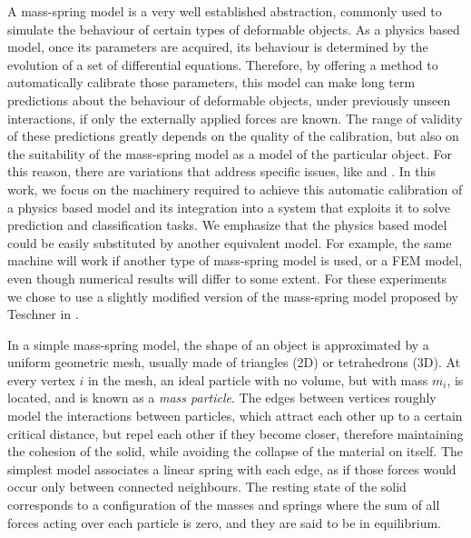 \documentclass[journal]{IEEEtran}
\newcommand{\sref}[1]{Section~\ref{#1}}
\begin{document}
A mass-spring model is a very well established abstraction, commonly used to simulate the behaviour of certain types of deformable objects.  As a physics based model, once its parameters are acquired, its behaviour is determined by the evolution of a set of differential equations.  Therefore, by offering a method to automatically calibrate those parameters, this model can make long term predictions about the behaviour of deformable objects, under previously unseen interactions, if only the externally applied forces are known.  The range of validity of these predictions greatly depends on the quality of the calibration, but also on the suitability of the mass-spring model as a model of the particular object.  For this reason, there are variations that address specific issues, like \cite{Bourguignon2000} and \cite{Teschner2004}.  In this work, we focus on the machinery required to achieve this automatic calibration of a physics based model and its integration into a system that exploits it to solve prediction and classification tasks.  We emphasize that the physics based model could be easily substituted by another equivalent model.  For example, the same machine will work if another type of mass-spring model is used, or a FEM model, even though numerical results will differ to some extent.  For these experiments we chose to use a slightly modified version of the mass-spring model proposed by Teschner in \cite{Teschner2004}.


In a simple mass-spring model, the shape of an object is approximated by a uniform geometric mesh, usually made of triangles (2D) or tetrahedrons (3D).  At every vertex $i$ in the mesh, an ideal particle with no volume, but with mass $m_i$, is located, and is known as a \textit{mass particle}.  The edges between vertices roughly model the interactions between particles, which attract each other up to a certain critical distance, but repel each other if they become closer, therefore maintaining the cohesion of the solid, while avoiding the collapse of the material on itself.  The simplest model associates a linear spring with each edge, as if those forces would occur only between connected neighbours.  The resting state of the solid corresponds to a configuration of the masses and springs where the sum of all forces acting over each particle is zero, and they are said to be in equilibrium.
\end{document}
